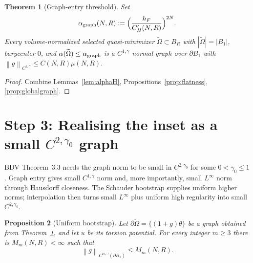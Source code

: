 \documentclass[11pt]{amsart}
\newtheorem{theorem}{Theorem}[section]
\newtheorem{proposition}[theorem]{Proposition}
\theoremstyle{definition}
\newcommand{\norm}[1]{\left\|#1\right\|}
\newcommand{\abs}[1]{\left|#1\right|}
\begin{document}
\begin{theorem}[Graph-entry threshold]\label{thm:graphentry}
Set
\[
\alpha_{\rm graph}(N,R):=\Bigl(\frac{h_F}{C_H'(N,R)}\Bigr)^{2N}.
\]
Every volume-normalized selected quasi-minimizer $\widetilde\Omega\subset B_R$ with
$\abs{\widetilde\Omega}=\abs{B_1}$, barycenter $0$, and
\(
\alpha(\widetilde\Omega)\le\alpha_{\rm graph}
\)
is a $C^{1,\gamma}$ normal graph over $\partial B_1$ with
$\norm{g}_{C^{1,\gamma}}\le C(N,R)\mu(N,R)$.
\end{theorem}

\begin{proof}
Combine Lemmas~\ref{lem:alphaH}, Propositions~\ref{prop:flatness},
\ref{prop:globalgraph}.
\end{proof}

\section{Step 3: Realising the inset as a small $C^{2,\gamma_0}$ graph}\label{sec:step3-radialgraph}

BDV Theorem~3.3 needs the graph norm to be small in $C^{2,\gamma_0}$ for some
$0<\gamma_0\le1$. Graph entry gives small $C^{1,\gamma}$ norm and, more
importantly, small $L^\infty$ norm through Hausdorff closeness. The Schauder
bootstrap supplies uniform higher norms; interpolation then turns small
$L^\infty$ plus uniform high regularity into small $C^{2,\gamma_0}$.

\begin{proposition}[Uniform bootstrap]\label{prop:bootstrap}
Let $\partial\widetilde\Omega=\{(1+g)\theta\}$ be a graph obtained from
Theorem~\ref{thm:graphentry}, and let $\widetilde u$ be its torsion potential.
For every integer $m\ge3$ there is $M_m(N,R)<\infty$ such that
\[
\norm{g}_{C^{m,\gamma}(\partial B_1)}\le M_m(N,R).
\]
\end{proposition}
\end{document}
